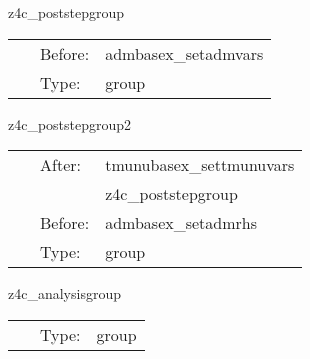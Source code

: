 \vspace{5mm}


\hspace{5mm} z4c\_poststepgroup 

\hspace{5mm}{\it post-process z4c variables } 


\hspace{5mm}

 \begin{tabular*}{160mm}{cll} 
~ & Before:  & admbasex\_setadmvars \\ 
~ & Type:  & group \\ 
\end{tabular*} 


\vspace{5mm}


\hspace{5mm} z4c\_poststepgroup2 

\hspace{5mm}{\it post-process z4c variables, part 2 } 


\hspace{5mm}

 \begin{tabular*}{160mm}{cll} 
~ & After:  & tmunubasex\_settmunuvars \\ 
~& ~ &z4c\_poststepgroup\\ 
~ & Before:  & admbasex\_setadmrhs \\ 
~ & Type:  & group \\ 
\end{tabular*} 


\vspace{5mm}


\hspace{5mm} z4c\_analysisgroup 

\hspace{5mm}{\it analyse z4c variables } 


\hspace{5mm}

 \begin{tabular*}{160mm}{cll} 
~ & Type:  & group \\ 
\end{tabular*} 


\vspace{5mm}

